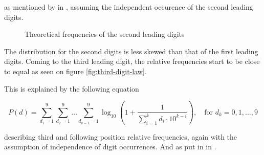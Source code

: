 as mentioned by \citeauthor{Hronova2023} in \citeyear{Hronova2023}, assuming the independent occurence of the second leading digits. 

\begin{figure}[h]
    \centering
    \caption{Theoretical frequencies of the second leading digits}  
    \label{fig:second-digit-law}
        \pgfplotsset{width=8.5cm,compat=1.18}
\end{figure}

The distribution for the second digits is less skewed than that of the first leading digits. 
Coming to the third leading digit, the relative frequencies start to be close to equal as seen on figure \ref{fig:third-digit-law}. \cite{kossovsky2014benford}

This is explained by the following equation 

\begin{equation}
    P(d) = \sum\limits_{d_1=1}^{9} \sum\limits_{d_2=1}^{9} \dots \sum\limits_{d_{k-1}=1}^{9}   \log_{10}\left( 1+\frac{1}{\sum\limits_{i=1}^{k} d_i \cdot 10^{k-i} }\right), \quad \text{for } d_k = 0,1,\dots,9 
\end{equation}

describing third and following position relative frequencies, again with the assumption of independence of digit occurrences. And  as put in \citeauthor{Hronova2023} in \citeyear{Hronova2023}. 


